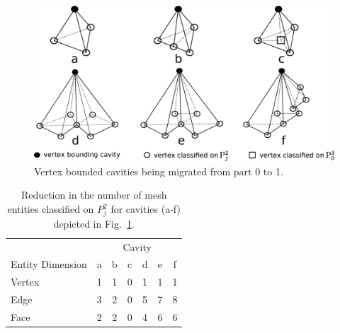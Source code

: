 %

\begin{figure} [h] \centering
  \includegraphics[width=.9\textwidth]{figs/cavities.eps}
  \caption{Vertex bounded cavities being migrated from part 0 to 1.}
  \label{fig:vtxCav}
\end{figure}

\begin{table} [h] \centering
  \footnotesize
  \caption{
    Reduction in the number of mesh entities classified on $P^2_j$ for cavities
    (a-f) depicted in Fig.~\ref{fig:vtxCav}.
  }
  \label{tbl:entReduction}
  \begin{tabular}{l|cccccc}
    & \multicolumn{6}{c}{Cavity} \\
    Entity Dimension & a & b & c & d & e & f \\
    \hline
    Vertex       & 1 & 1 & 0 & 1 & 1 & 1 \\
    Edge         & 3 & 2 & 0 & 5 & 7 & 8 \\
    Face         & 2 & 2 & 0 & 4 & 6 & 6 \\
  \end{tabular}
\end{table}

